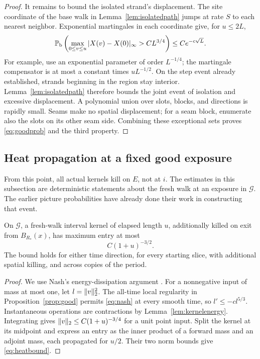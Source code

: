 \begin{proof}
It remains to bound the isolated strand's displacement.  The site
coordinate of the base walk in Lemma~\ref{lem:isolatedpath} jumps at
rate $S$ to each nearest neighbor.  Exponential martingales in each
coordinate give, for $u\le2L$,
\[
 \mathbb P_{\mathrm b}\left(\max_{0\le v\le u}
                   |X(v)-X(0)|_\infty>CL^{3/4}\right)
       \le C e^{-c\sqrt L}.
\]
For example, use an exponential parameter of order $L^{-1/4}$; the
martingale compensator is at most a constant times $uL^{-1/2}$.
On the step event already established, strands beginning in the
region stay interior.  Lemma~\ref{lem:isolatedpath} therefore bounds
the joint event of isolation and excessive displacement.  A polynomial
union over slots, blocks, and directions is rapidly small.  Seams make
no spatial displacement; for a seam block, enumerate also the slots
on its other seam side.  Combining these exceptional sets proves
\eqref{eq:goodprob} and the third property.
\end{proof}

\subsection{Heat propagation at a fixed good exposure}

From this point, all actual kernels kill on $E$, not at $i$.
The estimates in this subsection are deterministic statements about
the fresh walk at an exposure in $\mathcal G$.  The earlier picture
probabilities have already done their work in constructing that event.

\begin{lemma}\label{lem:heatbound}
On $\mathcal G$, a fresh-walk interval kernel of elapsed length $u$,
additionally killed on exit from $B_{R_*}(x)$, has maximum entry at most
\begin{equation}\label{eq:heatbound}
 C(1+u)^{-3/2}.
\end{equation}
The bound holds for either time direction, for every starting slice,
with additional spatial killing, and across copies of the period.
\end{lemma}

\begin{proof}
We use Nash's energy-dissipation argument
\cite[pp.~935--936]{Nash1958}.
For a nonnegative input of mass at most one, let $l=\lVert v\rVert_2^2$.
The all-time local regularity in Proposition~\ref{prop:good} permits
\eqref{eq:nash} at every smooth time, so
$l'\le-cl^{5/3}$.  Instantaneous operations are contractions by
Lemma~\ref{lem:kernelenergy}.  Integrating gives
$\lVert v\rVert_2\le C(1+u)^{-3/4}$ for a unit point input.
Split the kernel at its midpoint and express an entry as the inner
product of a forward mass and an adjoint mass, each propagated for
$u/2$.  Their two norm bounds give \eqref{eq:heatbound}.
\end{proof}

